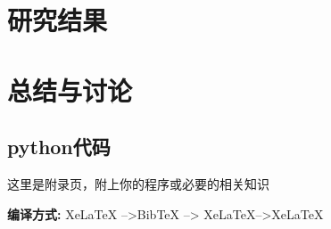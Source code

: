 \documentclass[AutoFakeBold]{fdureport}
\begin{document}
\chapter{研究结果}

\chapter{总结与讨论}

\backmatter


\printbib




\Appendix
\section{python代码}
\label{sec:code}


这里是附录页，附上你的程序或必要的相关知识\cite{partl2016}

{\bfseries 编译方式:} XeLaTeX -->BibTeX --> XeLaTeX-->XeLaTeX
\end{document}

